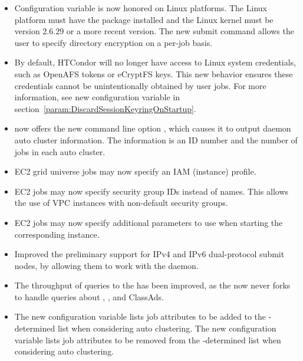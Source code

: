 \begin{itemize}

\item Configuration variable  
is now honored on Linux platforms.
The Linux platform must have the   package installed
and the Linux kernel must be version 2.6.29 or a more recent version.
The new submit command  allows the user
to specify directory encryption on a per-job basis.


\item By default, HTCondor will no longer have access to Linux 
	system credentials, such as OpenAFS tokens or eCryptFS keys.
	This new behavior ensures these credentials cannot be
	unintentionally obtained by user jobs.  
	For more information, see new configuration variable 
	in section~\ref{param:DiscardSessionKeyringOnStartup}.

\item {} now offers the new command line option , 
which causes it to output  daemon auto cluster information. 
The information is an ID number and the number of jobs in each auto cluster.

\item EC2 grid universe jobs may now specify an IAM (instance) profile.

\item EC2 jobs may now specify security group IDs instead of names.
This allows the use of VPC instances with non-default security groups.

\item EC2 jobs may now specify additional parameters to use when starting
the corresponding instance.

\item Improved the preliminary support for IPv4 and IPv6 dual-protocol
submit nodes,
by allowing them to work with the  daemon.

\item The throughput of queries to the  has been
improved, as the  now never forks to handle queries 
about , , and 
ClassAds.

\item The new configuration variable 
lists job attributes to be added to the -determined list
when considering auto clustering.
The new configuration variable 
lists job attributes to be removed from the -determined 
list when considering auto clustering.


\end{itemize}
